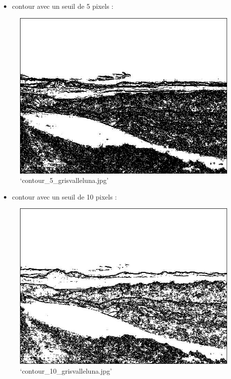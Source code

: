 \documentclass[11pt]{article}
\makeatletter
\def\maxwidth{\ifdim\Gin@nat@width>\linewidth\linewidth
    \else\Gin@nat@width\fi}
\let\Oldincludegraphics\includegraphics
\renewcommand{\includegraphics}[1]{\Oldincludegraphics[width=.8\maxwidth]{#1}}
\providecommand{\tightlist}{%
      \setlength{\itemsep}{0pt}\setlength{\parskip}{0pt}}
\makeatother
\begin{document}
\begin{itemize}
\tightlist
\item
  contour avec un seuil de 5 pixels :
\end{itemize}

\begin{figure}
\centering
\includegraphics{contour_5_grisvalleluna.jpg}
\caption{`contour\_5\_grisvalleluna.jpg'}
\end{figure}

\begin{itemize}
\tightlist
\item
  contour avec un seuil de 10 pixels :
\end{itemize}

\begin{figure}
\centering
\includegraphics{contour_10_grisvalleluna.jpg}
\caption{`contour\_10\_grisvalleluna.jpg'}
\end{figure}
\end{document}
